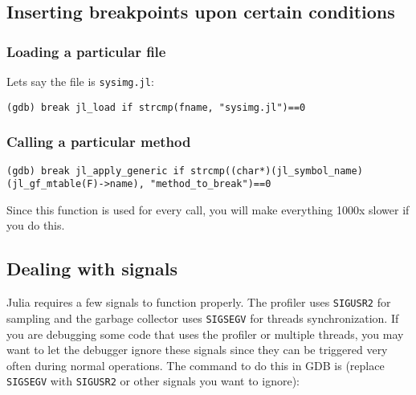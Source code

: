 \hypertarget{10952602490249170772}{}


\subsection{Inserting breakpoints upon certain conditions}



\hypertarget{796097711199942153}{}


\subsubsection{Loading a particular file}



Let{\textquotesingle}s say the file is \texttt{sysimg.jl}:




\begin{lstlisting}
(gdb) break jl_load if strcmp(fname, "sysimg.jl")==0
\end{lstlisting}



\hypertarget{11262037379695434792}{}


\subsubsection{Calling a particular method}




\begin{lstlisting}
(gdb) break jl_apply_generic if strcmp((char*)(jl_symbol_name)(jl_gf_mtable(F)->name), "method_to_break")==0
\end{lstlisting}



Since this function is used for every call, you will make everything 1000x slower if you do this.



\hypertarget{12553217263049394878}{}


\subsection{Dealing with signals}



Julia requires a few signals to function properly. The profiler uses \texttt{SIGUSR2} for sampling and the garbage collector uses \texttt{SIGSEGV} for threads synchronization. If you are debugging some code that uses the profiler or multiple threads, you may want to let the debugger ignore these signals since they can be triggered very often during normal operations. The command to do this in GDB is (replace \texttt{SIGSEGV} with \texttt{SIGUSR2} or other signals you want to ignore):




